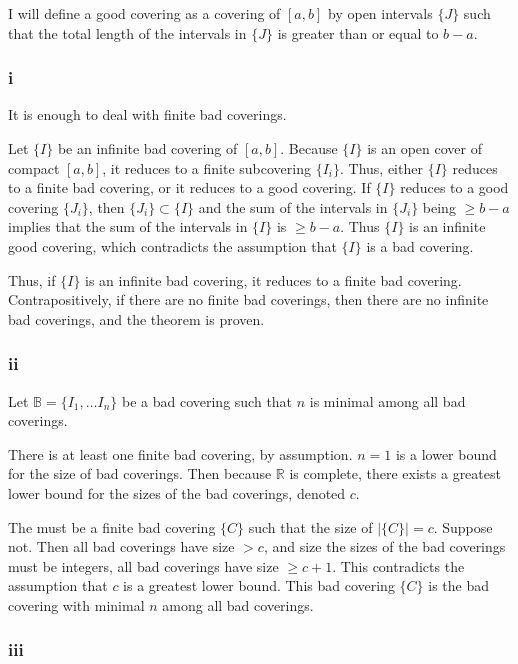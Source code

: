 \documentclass{article}
\newcommand{\R}{\mathbb{R}}
\newcommand{\B}{\mathbb{B}}
\begin{document}
I will define a good covering as a covering of $[a, b]$ by open intervals $\{J\}$ such that the total length of the intervals in $\{J\}$ is greater than or equal to $b-a$.

\subsubsection*{i}

It is enough to deal with finite bad coverings.

Let $\{I\}$ be an infinite bad covering of $[a, b]$. Because $\{I\}$ is an open cover of compact $[a, b]$, it reduces to a finite subcovering $\{I_i\}$. Thus, either $\{I\}$ reduces to a finite bad covering, or it reduces to a good covering. If $\{I\}$ reduces to a good covering $\{J_i\}$, then  $\{J_i\} \subset \{I\}$ and the sum of the intervals in $\{J_i\}$ being $\geq b-a$ implies that the sum of the intervals in $\{I\}$ is $\geq b-a$. Thus $\{I\}$ is an infinite good covering, which contradicts the assumption that $\{I\}$ is a bad covering.

Thus, if $\{I\}$ is an infinite bad covering, it reduces to a finite bad covering. Contrapositively, if there are no finite bad coverings, then there are no infinite bad coverings, and the theorem is proven.

\subsubsection*{ii}

Let $\B = \{I_1, \dots I_n\}$ be a bad covering such that $n$ is minimal among all bad coverings.

There is at least one finite bad covering, by assumption. $n=1$ is a lower bound for the size of bad coverings. Then because $\R$ is complete, there exists a greatest lower bound for the sizes of the bad coverings, denoted $c$.

The must be a finite bad covering $\{C\}$ such that the size of $|\{C\}| = c$. Suppose not. Then all bad coverings have size $> c$, and size the sizes of the bad coverings must be integers, all bad coverings have size $\geq c+1$. This contradicts the assumption that $c$ is a greatest lower bound. This bad covering $\{C\}$ is the bad covering with minimal $n$ among all bad coverings.

\subsubsection*{iii}
\end{document}
